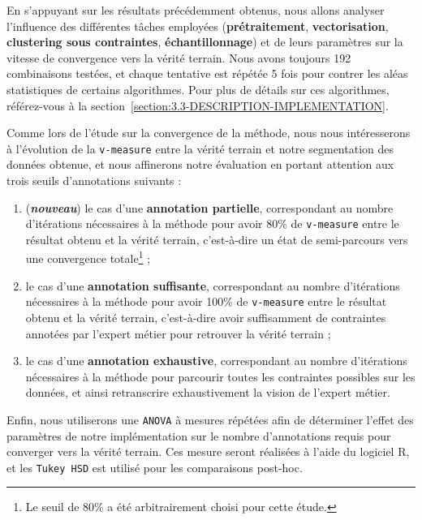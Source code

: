 				En s'appuyant sur les résultats précédemment obtenus, nous allons analyser l'influence des différentes tâches employées (\textbf{prétraitement}, \textbf{vectorisation}, \textbf{clustering sous contraintes}, \textbf{échantillonnage}) et de leurs paramètres sur la vitesse de convergence vers la vérité terrain.
				Nous avons toujours 192 combinaisons testées, et chaque tentative est répétée 5 fois pour contrer les aléas statistiques de certains algorithmes.
				Pour plus de détails sur ces algorithmes, référez-vous à la section~\ref{section:3.3-DESCRIPTION-IMPLEMENTATION}.
				
				Comme lors de l'étude sur la convergence de la méthode, nous nous intéresserons à l'évolution de la \texttt{v-measure} entre la vérité terrain et notre segmentation des données obtenue, et nous affinerons notre évaluation en portant attention aux trois seuils d'annotations suivants :
				\begin{enumerate}
					\item (\textbf{\textit{nouveau}}) le cas d'une \textbf{annotation partielle}, correspondant au nombre d'itérations nécessaires à la méthode pour avoir 80\% de \texttt{v-measure} entre le résultat obtenu et la vérité terrain, c'est-à-dire un état de semi-parcours vers une convergence totale\footnote{Le seuil de 80\% a été arbitrairement choisi pour cette étude.} ;
					\item le cas d'une \textbf{annotation suffisante}, correspondant au nombre d'itérations nécessaires à la méthode pour avoir 100\% de \texttt{v-measure} entre le résultat obtenu et la vérité terrain, c'est-à-dire avoir suffisamment de contraintes annotées par l'expert métier pour retrouver la vérité terrain ;
					\item le cas d'une \textbf{annotation exhaustive}, correspondant au nombre d'itérations nécessaires à la méthode pour parcourir toutes les contraintes possibles sur les données, et ainsi retranscrire exhaustivement la vision de l'expert métier.
				\end{enumerate}
				
				Enfin, nous utiliserons une \texttt{ANOVA} à mesures répétées afin de déterminer l’effet des paramètres de notre implémentation sur le nombre d’annotations requis pour converger vers la vérité terrain. Ces mesure seront réalisées à l’aide du logiciel R, et les \texttt{Tukey HSD} est utilisé pour les comparaisons post-hoc.
				
